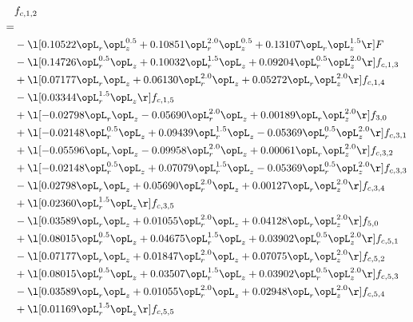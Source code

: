 \begin{alignat}{2} 
\label{eq:f_12_2} 
& f_{c,1,2} \nonumber \\ 
 = \\ 
& - \l[  0.10522 \opL_r \opL_z^{0.5} +  0.10851 \opL_r^{2.0} \opL_z^{0.5} +  0.13107 \opL_r \opL_z^{1.5}  \r] F \nonumber \\ 
& - \l[  0.14726 \opL_r^{0.5} \opL_z +  0.10032 \opL_r^{1.5} \opL_z +  0.09204 \opL_r^{0.5} \opL_z^{2.0}  \r] f_{c,1,3} \nonumber \\ 
& + \l[  0.07177 \opL_r \opL_z +  0.06130 \opL_r^{2.0} \opL_z +  0.05272 \opL_r \opL_z^{2.0}  \r] f_{c,1,4} \nonumber \\ 
& - \l[  0.03344 \opL_r^{1.5} \opL_z  \r] f_{c,1,5} \nonumber \\ 
& + \l[  -0.02798 \opL_r \opL_z   -0.05690 \opL_r^{2.0} \opL_z +  0.00189 \opL_r \opL_z^{2.0}  \r] f_{3,0} \nonumber \\ 
& + \l[  -0.02148 \opL_r^{0.5} \opL_z +  0.09439 \opL_r^{1.5} \opL_z   -0.05369 \opL_r^{0.5} \opL_z^{2.0}  \r] f_{c,3,1} \nonumber \\ 
& + \l[  -0.05596 \opL_r \opL_z   -0.09958 \opL_r^{2.0} \opL_z +  0.00061 \opL_r \opL_z^{2.0}  \r] f_{c,3,2} \nonumber \\ 
& + \l[  -0.02148 \opL_r^{0.5} \opL_z +  0.07079 \opL_r^{1.5} \opL_z   -0.05369 \opL_r^{0.5} \opL_z^{2.0}  \r] f_{c,3,3} \nonumber \\ 
& - \l[  0.02798 \opL_r \opL_z +  0.05690 \opL_r^{2.0} \opL_z +  0.00127 \opL_r \opL_z^{2.0}  \r] f_{c,3,4} \nonumber \\ 
& + \l[  0.02360 \opL_r^{1.5} \opL_z  \r] f_{c,3,5} \nonumber \\ 
& - \l[  0.03589 \opL_r \opL_z +  0.01055 \opL_r^{2.0} \opL_z +  0.04128 \opL_r \opL_z^{2.0}  \r] f_{5,0} \nonumber \\ 
& + \l[  0.08015 \opL_r^{0.5} \opL_z +  0.04675 \opL_r^{1.5} \opL_z +  0.03902 \opL_r^{0.5} \opL_z^{2.0}  \r] f_{c,5,1} \nonumber \\ 
& - \l[  0.07177 \opL_r \opL_z +  0.01847 \opL_r^{2.0} \opL_z +  0.07075 \opL_r \opL_z^{2.0}  \r] f_{c,5,2} \nonumber \\ 
& + \l[  0.08015 \opL_r^{0.5} \opL_z +  0.03507 \opL_r^{1.5} \opL_z +  0.03902 \opL_r^{0.5} \opL_z^{2.0}  \r] f_{c,5,3} \nonumber \\ 
& - \l[  0.03589 \opL_r \opL_z +  0.01055 \opL_r^{2.0} \opL_z +  0.02948 \opL_r \opL_z^{2.0}  \r] f_{c,5,4} \nonumber \\ 
& + \l[  0.01169 \opL_r^{1.5} \opL_z  \r] f_{c,5,5} \nonumber \\ 

\end{alignat}
